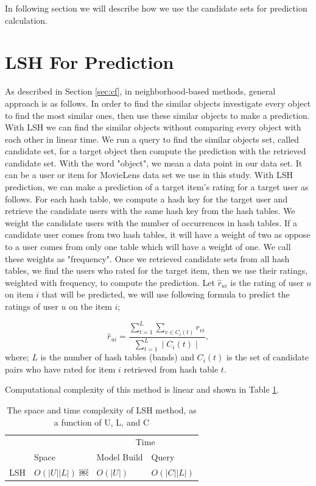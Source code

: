 \documentclass[conference]{IEEEtran}
\begin{document}
In following section we will describe how we use the candidate sets for prediction calculation.


\section{LSH For Prediction}
\label{sec:lsh-prediction}

As described in Section \ref{sec:cf}, in neighborhood-based methods, general
approach is as follows. In order to find the similar objects investigate every 
object to find the most similar ones, then use these similar objects to make a 
prediction. With LSH we can find the similar objects without comparing every 
object with each other in linear time. We run a query to find the similar 
objects set, called candidate set, for a target object then compute the 
prediction with the retrieved candidate set. With the word "object", we mean
a data point in our data set. It can be a user or item for MovieLens data set we 
use in this study. With LSH prediction, we can make a prediction of a target 
item's rating for a target user as follows. For each hash table, we compute a 
hash key for the target user and retrieve the candidate users with the same 
hash key from the hash tables. We weight the candidate users with the number of
occurrences in hash tables. If a candidate user comes from two hash tables, 
it will have a weight of two as oppose to a user comes from only one table 
which will have a weight of one. We call these weights as "frequency". 
Once we retrieved candidate sets from all hash tables, we find the users who 
rated for the target item, then we use their ratings, weighted with frequency, 
to compute the prediction. Let $\hat{r}_{ui}$ is the rating of user $u$ on 
item $i$ that will be predicted, we will use following formula to predict the 
ratings of user $u$ on the item $i$;

\begin{equation}
\hat{r}_{ui} = \frac{\sum\limits_{t=1}^{L} \sum\limits_{v \in C_i(t)} r_{vi}}{\sum\limits_{t=1}^{L} \mid C_i(t) \mid} ,
\label{eq:lsh-prediction}
\end{equation}
where; $L$ is the number of hash tables (bands) and  $C_i(t)$ is the set of 
candidate pairs who have rated for item $i$ retrieved from hash table $t$.

Computational complexity of this method is linear and shown in Table \ref{table:complexity-lsh}.

\begin{table}
\centering
\begin{tabular}{llll}
\hline
& & \multicolumn {2}{c}{Time} \\
\cline{3-4}
     & Space & Model Build  & Query \\
\hline
LSH & $O(|U||L|)$ ￼& $O(|U|)$ &$O(|C||L|)$ \\
\hline
\end{tabular}
\caption{The space and time complexity of LSH  method, as a function of U, L, and C}
\label{table:complexity-lsh}
\end{table}
\end{document}
